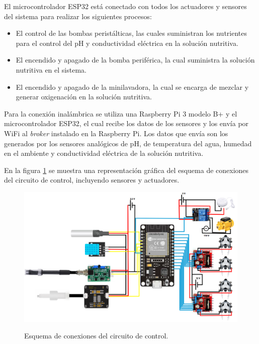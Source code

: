 \newpage
El microcontrolador ESP32 está conectado con todos los actuadores y sensores del sistema para realizar los siguientes procesos:
\begin{itemize}
\item El control de las bombas peristálticas, las cuales suministran los nutrientes para el control del pH y conductividad eléctrica en la solución nutritiva. 
\item El encendido y apagado de la bomba periférica, la cual suministra la solución nutritiva en el sistema.
\item El encendido y apagado de la minilavadora, la cual se encarga de mezclar y generar oxigenación en la solución nutritiva.

\end{itemize}

Para la conexión inalámbrica se utiliza una Raspberry Pi 3 modelo B+ y el microcontrolador ESP32, el cual recibe los datos de los sensores y los envía por WiFi al \textit{broker} instalado en la Raspberry Pi. Los datos que envía son los generados por los sensores analógicos de pH, de temperatura del agua, humedad en el ambiente y conductividad eléctrica de la solución nutritiva.

En la figura \ref{circuito1} se muestra una representación gráfica del esquema de conexiones del circuito de control, incluyendo sensores y actuadores.
\begin{figure}[H]
\centering
         \includegraphics[scale=0.56, angle=90]{imgs/circuito.PNG} \\
    \caption{Esquema de conexiones del circuito de control.}\label{circuito1}
\end{figure}

